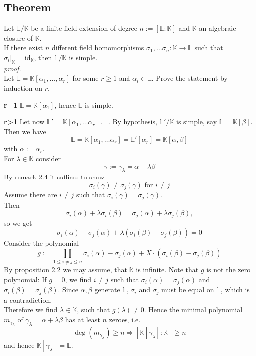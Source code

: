 \documentclass[12pt]{book}
\begin{document}
\begin{spacing}{1.3}
\subsection{Theorem} %
Let $\mathbb{L}/\mathbb{K}$ be a finite field extension of degree $n:=[\mathbb{L}:\mathbb{K}]$ and $\overline{\mathbb{K}}$ an algebraic closure of $\mathbb{K}$.\\
If there exist $n$ different field homomorphisms $\sigma_1, \dots \sigma_n: \mathbb{K} \longrightarrow \mathbb{L}$ such that\\ $\sigma_i |_{\mathbb{K}}=\textrm{id}_{\mathbb{K}}$, then $\mathbb{L}/\mathbb{K}$ is simple.\\
\textit{proof.}\\
Let $\mathbb{L}=\mathbb{K}[\alpha_1,...,\alpha_r]$ for some $r\geqslant 1 $ and $\alpha_i \in \mathbb{L}$. Prove the statement by induction on $r$.
\begin{compactitem}
\item[\textbf{r=1}] $\mathbb{L}=\mathbb{K}[\alpha_1]$, hence $\mathbb{L}$ is simple.
\item[\textbf{r>1}] Let now $\mathbb{L}'=\mathbb{K}[\alpha_1, \dots \alpha_{r-1}]$. By hypothesis, $\mathbb{L}'/\mathbb{K}$ is simple, say $\mathbb{L}=\mathbb{K}[\beta]$. Then we have $$\mathbb{L}=\mathbb{K}[\alpha_1, \dots \alpha_r]=\mathbb{L}'[\alpha_r]=\mathbb{K}[\alpha, \beta]$$ with $\alpha:=\alpha_r$.\\
For $\lambda \in \mathbb{K}$ consider $$\gamma:=\gamma_{\lambda}=\alpha + \lambda \beta$$By remark 2.4 it suffices to show $$\sigma_i(\gamma) \neq \sigma_j(\gamma) \textrm{ for }i\neq j$$Assume there are $i\neq j$ such that $\sigma_i(\gamma)=\sigma_j(\gamma)$.\\
Then $$\sigma_i(\alpha)+ \lambda \sigma_i(\beta)=\sigma_j(\alpha)+\lambda \sigma_j(\beta),$$so we get $$\sigma_i(\alpha)-\sigma_j(\alpha)+\lambda\left(\sigma_i(\beta)-\sigma_j(\beta)\right)=0$$Consider the polynomial $$g:=\prod_{1\leqslant i \neq j \leqslant n}\sigma_i(\alpha)-\sigma_j(\alpha)+X\cdot\left(\sigma_i(\beta)-\sigma_j(\beta)\right)$$
By proposition 2.2 we may assume, that $\mathbb{K}$ is infinite. Note that $g$ is not the zero polynomial: If $g=0$, we find $i\neq j$ such that $\sigma_i(\alpha)=\sigma_j(\alpha)$ and $\sigma_i(\beta)=\sigma_j(\beta)$. Since $\alpha, \beta$ generate $\mathbb{L}$, $\sigma_i$ and $\sigma_j$ must be equal on $\mathbb{L}$, which is a contradiction.\\
Therefore we find $\lambda \in \mathbb{K}$, such that $g(\lambda)\neq 0$. Hence the minimal polynomial $m_{\gamma_{\lambda}}$ of $\gamma_{\lambda}=\alpha + \lambda \beta$ has at least $n$ zeroes, i.e. $$\deg(m_{\gamma_{\lambda}}) \geqslant n \Rightarrow [\mathbb{K}[\gamma_{\lambda}]:\mathbb{K}]\geqslant n$$ and hence $\mathbb{K}[\gamma_{\lambda}]=\mathbb{L}$.
\end{compactitem}


\end{spacing}
\end{document}
